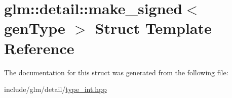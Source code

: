 \hypertarget{structglm_1_1detail_1_1make__signed}{}\section{glm\+:\+:detail\+:\+:make\+\_\+signed$<$ gen\+Type $>$ Struct Template Reference}
\label{structglm_1_1detail_1_1make__signed}


The documentation for this struct was generated from the following file\+:\begin{DoxyCompactItemize}
\item 
include/glm/detail/\hyperlink{type__int_8hpp}{type\+\_\+int.\+hpp}\end{DoxyCompactItemize}
